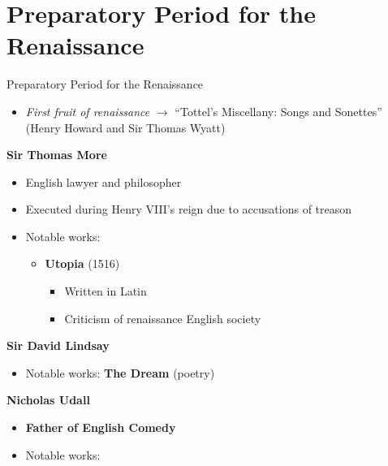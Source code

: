 \documentclass[
  12pt,
    progressbar=frametitle]{beamer}
\providecommand{\tightlist}{%
  \setlength{\itemsep}{0pt}\setlength{\parskip}{0pt}}
\begin{document}
\section{Preparatory Period for the Renaissance}
\begin{frame}[allowframebreaks]
{Preparatory Period for the Renaissance}
\begin{itemize}
\tightlist
\item
  \emph{First fruit of renaissance} \(\rightarrow\) ``Tottel's
  Miscellany: Songs and Sonettes'' (Henry Howard and Sir Thomas Wyatt)
\end{itemize}

\vspace{-3mm}
\large\textbf{Sir Thomas More}\normalsize\vspace{-3mm}

\begin{itemize}
\tightlist
\item
  English lawyer and philosopher
\item
  Executed during Henry VIII's reign due to accusations of treason
\item
  Notable works:

  \begin{itemize}
  \tightlist
  \item
    \textbf{Utopia} (1516)

    \begin{itemize}
    \tightlist
    \item
      Written in Latin
    \item
      Criticism of renaissance English society
    \end{itemize}
  \end{itemize}
\end{itemize}

\large\textbf{Sir David Lindsay}\normalsize\vspace{-3mm}

\begin{itemize}
\tightlist
\item
  Notable works: \textbf{The Dream} (poetry)
\end{itemize}

\large\textbf{Nicholas Udall}\normalsize\vspace{-3mm}

\begin{itemize}
\tightlist
\item
  \textbf{Father of English Comedy}
\item
  Notable works:


\end{itemize}
\end{frame}
\end{document}

